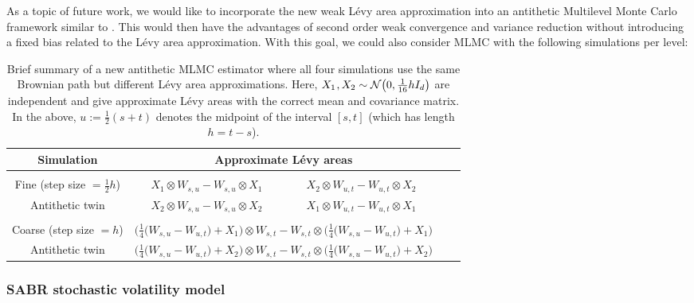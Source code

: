 \documentclass[sn-mathphys-num]{sn-jnl}%
\newcommand{\m}{\hspace{0.25mm}}
\begin{document}
As a topic of future work, we would like to incorporate the new weak L\'{e}vy area approximation into an antithetic Multilevel Monte Carlo framework similar to \cite{algerbi2016mlmc, iguchi2025anti}.
This would then have the advantages of second order weak convergence and variance reduction without introducing a fixed bias related to the L\'{e}vy area approximation.
With this goal, we could also consider MLMC with the following simulations per level:\vspace{-1mm}
\begin{table}[ht]
\centering
\begin{tabular}{ccccc}
\toprule
Simulation &   \multicolumn{2}{c}{Approximate L\'{e}vy areas} \\
\midrule\\[-8pt]
Fine (\hspace{0.25mm}step size $ = \frac{1}{2}h$)  & \hspace{5mm} $X_1\otimes W_{s,u} - W_{s,u}\otimes X_1$ & $X_2\otimes W_{u,t} - W_{u,t}\otimes X_2$ \\[5pt]
Antithetic twin  & \hspace{5mm} $X_2\otimes W_{s,u} - W_{s,u}\otimes X_2$ & $X_1\otimes W_{u,t} - W_{u,t}\otimes X_1$ \\[2pt]
\midrule\\[-8pt]
Coarse (\hspace{0.25mm}step size $ = h$) &   \multicolumn{2}{c}{$\big(\frac{1}{4}\big(W_{s,u} - W_{u,t}\big) + X_1\big)\otimes W_{s,t} - W_{s,t}\otimes\big(\frac{1}{4}\big(W_{s,u} - W_{u,t}\big) + X_1\big)$} \\[5pt]
Antithetic twin & \multicolumn{2}{c}{$\big(\frac{1}{4}\big(W_{s,u} - W_{u,t}\big) + X_2\big)\otimes W_{s,t} - W_{s,t}\otimes\big(\frac{1}{4}\big(W_{s,u} - W_{u,t}\big) + X_2\big)$}\\[2pt]
\bottomrule
\end{tabular}\medbreak
\caption{Brief summary of a new antithetic MLMC estimator where all four simulations use the same Brownian path but different L\'{e}vy area approximations. Here, $X_1\m, X_2\sim\mathcal{N}\big(0,\frac{1}{16}hI_d\big)$ are independent and give approximate L\'{e}vy areas with the correct mean and covariance matrix.\\ In the above, $u := \frac{1}{2}(s+t)$ denotes the midpoint of the interval $[s,t]$ (which has length $h = t - s$).}
\label{tab:future_mlmc}
\end{table}


\subsubsection{SABR stochastic volatility model}
\end{document}

